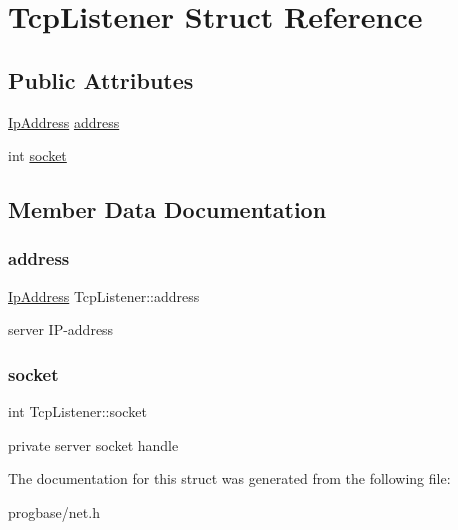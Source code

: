 \hypertarget{struct_tcp_listener}{}\section{Tcp\+Listener Struct Reference}
\label{struct_tcp_listener}
\subsection*{Public Attributes}
\begin{DoxyCompactItemize}
\item 
\hyperlink{struct_ip_address}{Ip\+Address} \hyperlink{struct_tcp_listener_a37d9431c48ac9be28ea2da441e40e3f9}{address}
\item 
int \hyperlink{struct_tcp_listener_adaac9e83a2bdbc733a14f31405ffbcf9}{socket}
\end{DoxyCompactItemize}


\subsection{Member Data Documentation}
\mbox{\label{struct_tcp_listener_a37d9431c48ac9be28ea2da441e40e3f9}} 
\subsubsection{\texorpdfstring{address}{address}}
{\footnotesize\ttfamily \hyperlink{struct_ip_address}{Ip\+Address} Tcp\+Listener\+::address}

server I\+P-\/address \mbox{\label{struct_tcp_listener_adaac9e83a2bdbc733a14f31405ffbcf9}} 
\subsubsection{\texorpdfstring{socket}{socket}}
{\footnotesize\ttfamily int Tcp\+Listener\+::socket}

private server socket handle 

The documentation for this struct was generated from the following file\+:\begin{DoxyCompactItemize}
\item 
progbase/net.\+h\end{DoxyCompactItemize}
